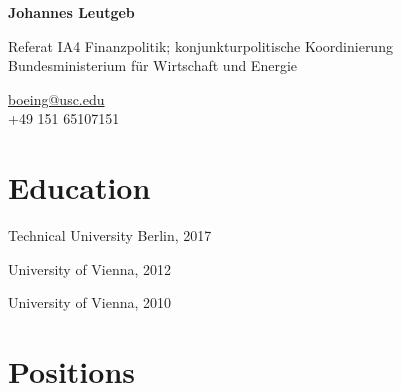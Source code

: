 \documentclass[11pt,a4paper]{report} %
\newcommand{\myname}{Johannes Leutgeb}
\newcommand{\namefont}[1]{{\normalfont\bfseries\Huge{#1}}}
\begin{document}
\raggedright{}

\namefont{\myname}

\vspace{1em}
\begin{minipage}[t]{0.700\textwidth}
  Referat IA4 Finanzpolitik; konjunkturpolitische Koordinierung \\
  Bundesministerium für Wirtschaft und Energie \\
\end{minipage}
\begin{minipage}[t]{0.295\textwidth}
  \raggedleft{}
  \href{mailto:boeing@usc.edu}{boeing@usc.edu} \\
  +49 151 65107151 \\
\end{minipage}

\section*{Education}

\begin{tablist}

\item[PhD] \tab{}Technical University Berlin, 2017
\item[MS]  \tab{}University of Vienna, 2012
\item[BS]  \tab{}University of Vienna, 2010

\end{tablist}

\section*{Positions}
\end{document}
